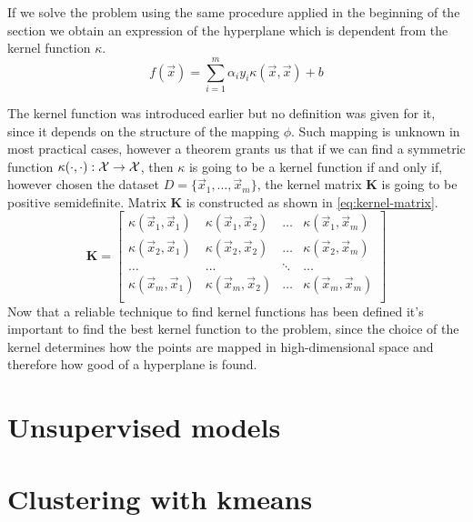 If we solve the problem using the same procedure applied in the beginning of the section we obtain
an expression of the hyperplane which is dependent from the kernel function $\kappa$.
\begin{equation}
	\label{eq:hd-of}
	f(\vec{x}) = \sum_{i = 1}^m\alpha_iy_i\kappa(\vec{x}, \vec{x}) + b
\end{equation}

The kernel function was introduced earlier but no definition was given for it, since it depends on
the structure of the mapping $\phi$. Such mapping is unknown in most practical cases, however a
theorem grants us that if we can find a symmetric function $\kappa(\cdot, \cdot): \mathcal{X} \rightarrow
\mathcal{X}$, then $\kappa$ is going to be a kernel function if and only if, however chosen the dataset $D
= \{\vec{x}_1, \ldots, \vec{x}_m\}$, the kernel matrix $\mathbf{K}$ is going to be positive
semidefinite. Matrix $\mathbf{K}$ is constructed as shown in \cref{eq:kernel-matrix}.
\begin{equation}
	\label{eq:kernel-matrix}
	\mathbf{K} = 
	\begin{bmatrix}
		\kappa(\vec{x}_1, \vec{x}_1) & \kappa(\vec{x}_1, \vec{x}_2) & \ldots &
		\kappa(\vec{x}_1, \vec{x}_m) \\
		\kappa(\vec{x}_2, \vec{x}_1) & \kappa(\vec{x}_2, \vec{x}_2) & \ldots &
		\kappa(\vec{x}_2, \vec{x}_m) \\
		\ldots & \ldots & \ddots & \ldots \\
		\kappa(\vec{x}_m, \vec{x}_1) & \kappa(\vec{x}_m, \vec{x}_2) & \ldots &
		\kappa(\vec{x}_m, \vec{x}_m) \\
	\end{bmatrix}
\end{equation}
Now that a reliable technique to find kernel functions has been defined it's important to find the
best kernel function to the problem, since the choice of the kernel determines how the points are
mapped in high-dimensional space and therefore how good of a hyperplane is found.

\section{Unsupervised models}
\label{sec:uml}

\section{Clustering with k\-means}
\label{sec:kmeans}
